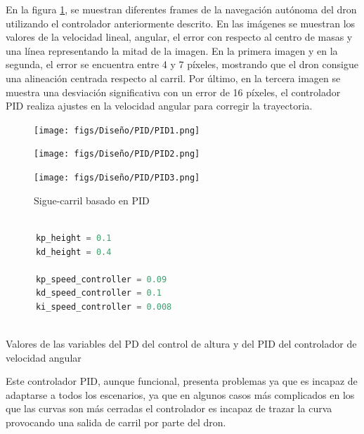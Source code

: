En la figura \ref{sigue-carril}, se muestran diferentes frames de la navegación autónoma 
del dron utilizando el controlador anteriormente descrito. En las imágenes
se muestran los valores de la velocidad lineal, angular, el error con respecto al centro de masas y una línea representando la mitad de la imagen. 
En la primera imagen y en la segunda, el error se encuentra
entre 4 y 7 píxeles, mostrando que el dron consigue una alineación centrada respecto al carril. Por último, en la tercera imagen 
se muestra una desviación significativa con un error de 16 píxeles, el controlador
PID realiza ajustes en la velocidad angular para corregir la trayectoria. 

\begin{figure}[H]
  \centering
  \begin{minipage}[t]{0.3\textwidth}
      \centering
      \texttt{[image: figs/Diseño/PID/PID1.png]}
  \end{minipage}
  \hfill
  \begin{minipage}[t]{0.3\textwidth}
      \centering
      \texttt{[image: figs/Diseño/PID/PID2.png]}
  \end{minipage}
  \hfill
  \begin{minipage}[t]{0.3\textwidth}
      \centering
      \texttt{[image: figs/Diseño/PID/PID3.png]}
  \end{minipage}
  \caption{Sigue-carril basado en PID}
  \label{sigue-carril}
  \vspace{-1.5em}
\end{figure}

  \begin{code}[h]
    \begin{lstlisting}[language=Python]

      kp_height = 0.1
      kd_height = 0.4

      kp_speed_controller = 0.09
      kd_speed_controller = 0.1
      ki_speed_controller = 0.008
     
    \end{lstlisting}
    \caption[Valores de las variables del PD del control de altura y del PID del controlador de velocidad angular]{Valores de las variables del PD del control de altura y del PID del controlador de velocidad angular}
    \label{cod:ValoresPID}
    \end{code} 

   

Este controlador PID, aunque funcional, presenta problemas ya que es incapaz de adaptarse a todos los escenarios, ya que en algunos casos más complicados en los que las curvas son más cerradas
el controlador es incapaz de trazar la curva provocando una salida de carril por parte del dron. 

